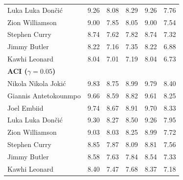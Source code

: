 \documentclass[11pt,a4paper]{article}
\begin{document}
\begin{table}[H]
\begin{tabular}{lccccc}
Luka Luka Don\v{c}i\'{c} & 9.26 & 8.08 & 8.29 & 9.26 & 7.76 \\
Zion Williamson & 9.00 & 7.85 & 8.05 & 9.00 & 7.54 \\
Stephen Curry & 8.74 & 7.62 & 7.82 & 8.74 & 7.32 \\
Jimmy Butler & 8.22 & 7.16 & 7.35 & 8.22 & 6.88 \\
Kawhi Leonard & 8.04 & 7.01 & 7.19 & 8.04 & 6.73 \\
\midrule
\multicolumn{6}{l}{\textbf{ACI ($\gamma=0.05$)}} \\
\midrule
Nikola Nikola Joki\'{c} & 9.83 & 8.75 & 8.99 & 9.79 & 8.40 \\
Giannis Antetokounmpo & 9.66 & 8.59 & 8.82 & 9.61 & 8.25 \\
Joel Embiid & 9.74 & 8.67 & 8.91 & 9.70 & 8.33 \\
Luka Luka Don\v{c}i\'{c} & 9.30 & 8.27 & 8.50 & 9.26 & 7.95 \\
Zion Williamson & 9.03 & 8.03 & 8.25 & 8.99 & 7.72 \\
Stephen Curry & 8.85 & 7.87 & 8.09 & 8.81 & 7.56 \\
Jimmy Butler & 8.58 & 7.63 & 7.84 & 8.54 & 7.33 \\
Kawhi Leonard & 8.40 & 7.47 & 7.68 & 8.37 & 7.18 \\
\bottomrule
\end{tabular}
\end{table}
\end{document}
